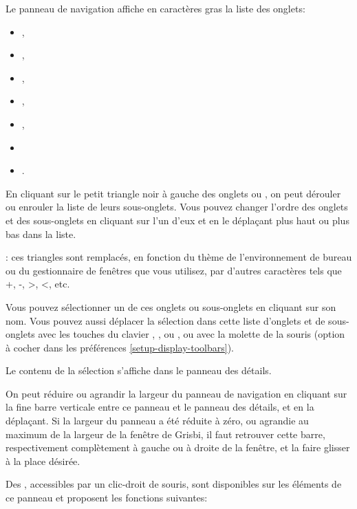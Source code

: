 Le panneau de navigation affiche en caractères gras la liste des onglets:

	\begin{itemize}
		\item {},
		\item {},
		\item {},
		\item {},
		\item {},
		\item {}
		\item {}.
	\end{itemize}
En cliquant sur le petit triangle noir à gauche des onglets  ou , on peut dérouler ou enrouler la liste de leurs sous-onglets. Vous pouvez changer l'ordre des onglets et des sous-onglets en cliquant sur l'un d'eux et en le déplaçant plus haut ou plus bas dans la liste.


\Note{}: ces triangles sont remplacés, en fonction du thème de l'environnement de bureau ou du gestionnaire de fenêtres que vous utilisez, par d'autres caractères tels que +, -, >, <, etc.

Vous pouvez sélectionner un de ces onglets ou sous-onglets en cliquant sur son nom. Vous pouvez aussi déplacer la sélection dans cette liste d'onglets et de sous-onglets avec les touches du clavier \keys{\arrowkeyup}, \keys{\arrowkeydown},  ou , ou avec la molette de la souris (option à cocher dans les préférences \vref{setup-display-toolbars}). 


Le contenu de la sélection s'affiche dans le panneau des détails. 

On peut réduire ou agrandir la largeur du panneau de navigation en cliquant sur la fine barre verticale entre ce panneau et le panneau des détails, et en la déplaçant. Si la largeur du panneau a été réduite à zéro, ou agrandie au maximum de la largeur de la fenêtre de Grisbi, il faut retrouver cette barre, respectivement complètement à gauche ou à droite de la fenêtre, et la faire glisser à la place désirée. 

Des , accessibles par un clic-droit de souris, sont disponibles sur les éléments de ce panneau et proposent les fonctions suivantes:

